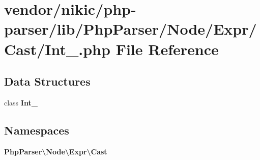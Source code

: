 \section{vendor/nikic/php-\/parser/lib/\+Php\+Parser/\+Node/\+Expr/\+Cast/\+Int\+\_\+.php File Reference}
\label{_int___8php}
\subsection*{Data Structures}
\begin{DoxyCompactItemize}
\item 
class {\bf Int\+\_\+}
\end{DoxyCompactItemize}
\subsection*{Namespaces}
\begin{DoxyCompactItemize}
\item 
 {\bf Php\+Parser\textbackslash{}\+Node\textbackslash{}\+Expr\textbackslash{}\+Cast}
\end{DoxyCompactItemize}
